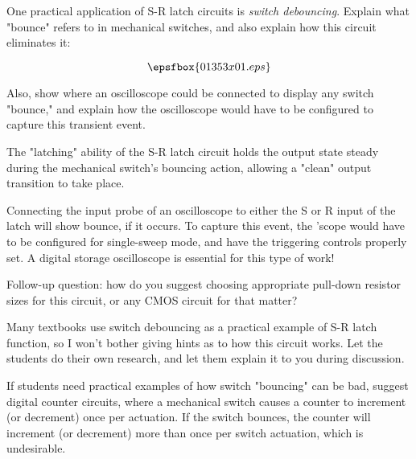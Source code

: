 

One practical application of S-R latch circuits is {\it switch debouncing}.  Explain what "bounce" refers to in mechanical switches, and also explain how this circuit eliminates it:

$$\epsfbox{01353x01.eps}$$

Also, show where an oscilloscope could be connected to display any switch "bounce," and explain how the oscilloscope would have to be configured to capture this transient event.







The "latching" ability of the S-R latch circuit holds the output state steady during the mechanical switch's bouncing action, allowing a "clean" output transition to take place.  

Connecting the input probe of an oscilloscope to either the S or R input of the latch will show bounce, if it occurs.  To capture this event, the 'scope would have to be configured for single-sweep mode, and have the triggering controls properly set.  A digital storage oscilloscope is essential for this type of work!

\vskip 10pt

Follow-up question: how do you suggest choosing appropriate pull-down resistor sizes for this circuit, or any CMOS circuit for that matter?







Many textbooks use switch debouncing as a practical example of S-R latch function, so I won't bother giving hints as to how this circuit works.  Let the students do their own research, and let them explain it to you during discussion.

If students need practical examples of how switch "bouncing" can be bad, suggest digital counter circuits, where a mechanical switch causes a counter to increment (or decrement) once per actuation.  If the switch bounces, the counter will increment (or decrement) more than once per switch actuation, which is undesirable.

